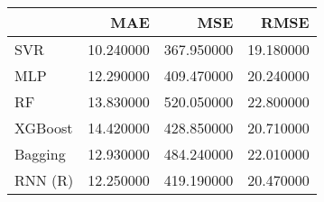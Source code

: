 \begin{tabular}{lrrr}
\toprule
 & MAE & MSE & RMSE \\
\midrule
SVR & 10.240000 & 367.950000 & 19.180000 \\
MLP & 12.290000 & 409.470000 & 20.240000 \\
RF & 13.830000 & 520.050000 & 22.800000 \\
XGBoost & 14.420000 & 428.850000 & 20.710000 \\
Bagging & 12.930000 & 484.240000 & 22.010000 \\
RNN (R) & 12.250000 & 419.190000 & 20.470000 \\
\bottomrule
\end{tabular}
